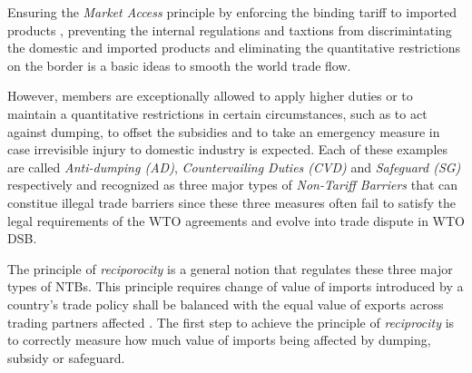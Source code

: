 Ensuring the \textit{Market Access} principle 
by enforcing
the binding tariff to imported products
, preventing the internal regulations 
and taxtions from discrimintating the domestic and imported products
and eliminating the quantitative restrictions on the border 
is a basic ideas to smooth the world trade flow. 

However, members are exceptionally allowed to apply higher duties or to maintain a quantitative restrictions in certain circumstances, such as 
to act against dumping, to offset the subsidies 
and to take an emergency measure in case irrevisible injury to domestic industry is expected. Each of these examples 
are called \textit{Anti-dumping (AD)}, \textit{Countervailing Duties (CVD)} and \textit{Safeguard (SG)} respectively and recognized as 
three major types of \textit{Non-Tariff Barriers} that can constitue illegal trade barriers 
since these three measures often fail to satisfy the legal requirements of the WTO agreements and evolve into trade dispute in WTO DSB.

The principle of \textit{reciporocity} is a general notion that regulates these three major types of NTBs.
This principle requires change of value of imports introduced by a country's trade policy 
shall be balanced with the equal value of exports across trading partners affected \citep{bagwell1999}.
The first step to achieve the principle of \textit{reciprocity} is to correctly measure 
how much value of imports being affected by dumping, subsidy or safeguard. %





